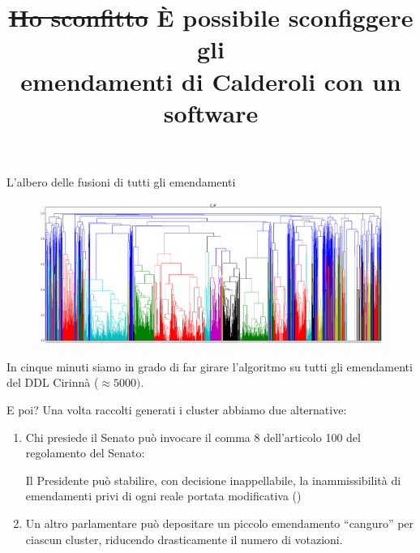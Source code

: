 \documentclass[12pt]{beamer}
\begin{document}
  \begin{frame}{L'albero delle fusioni di tutti gli emendamenti}
    \begin{figure}
      \centering
      \includegraphics[width=\textwidth]{tex/img/tree-all}
    \end{figure}

    \vspace{0.25cm}

    In cinque minuti siamo in grado di far girare l'algoritmo su tutti gli
    emendamenti del DDL Cirinnà (\(\approx 5000)\).
  \end{frame}

  \begin{frame}{E poi?}
    Una volta raccolti generati i cluster abbiamo due alternative:

    \vspace{0.25cm}

    \begin{enumerate}
      \item Chi presiede il Senato può \mbox{invocare} il comma 8 dell'articolo 100
        del regolamento del Senato:
        \begin{displayquote}
          Il Presidente può stabilire, con decisione inappellabile, la
          inammissibilità di emendamenti privi di ogni reale portata
          modificativa (\textellipsis)
        \end{displayquote}
      \item Un altro parlamentare può depositare un piccolo emendamento
        ``canguro'' per ciascun cluster, riducendo drasticamente il numero di
        votazioni.
    \end{enumerate}
  \end{frame}

  \begin{frame}[plain]
    \titlepage{}
  \end{frame}

  \title[Ho sconfitto gli emendamenti di Calderoli con un software]{
    \st{Ho sconfitto} È possibile sconfiggere gli\\
    emendamenti di Calderoli con un software
  }
  \begin{frame}[plain]
    \titlepage{}
  \end{frame}
\end{document}
